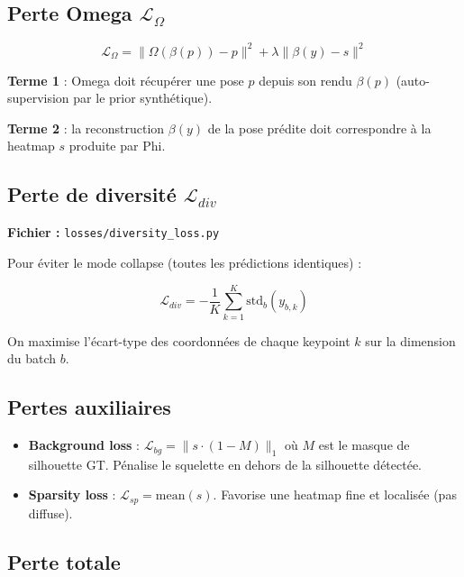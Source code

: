 \documentclass[12pt,a4paper]{article}
\begin{document}
\subsection{Perte Omega $\mathcal{L}_\Omega$}

\begin{equation}
  \mathcal{L}_\Omega = \|\Omega(\beta(p)) - p\|^2 + \lambda \|\beta(y) - s\|^2
\end{equation}

\textbf{Terme 1} : Omega doit récupérer une pose $p$ depuis son rendu $\beta(p)$
(auto-supervision par le prior synthétique).

\textbf{Terme 2} : la reconstruction $\beta(y)$ de la pose prédite doit correspondre
à la heatmap $s$ produite par Phi.

\subsection{Perte de diversité $\mathcal{L}_{div}$}

\textbf{Fichier :} \texttt{losses/diversity\_loss.py}

Pour éviter le mode collapse (toutes les prédictions identiques) :

\begin{equation}
  \mathcal{L}_{div} = -\frac{1}{K} \sum_{k=1}^{K} \text{std}_{b}(y_{b,k})
\end{equation}

On maximise l'écart-type des coordonnées de chaque keypoint $k$ sur la dimension
du batch $b$.

\subsection{Pertes auxiliaires}

\begin{itemize}
  \item \textbf{Background loss} : $\mathcal{L}_{bg} = \|s \cdot (1 - M)\|_1$
        où $M$ est le masque de silhouette GT. Pénalise le squelette en dehors
        de la silhouette détectée.
  \item \textbf{Sparsity loss} : $\mathcal{L}_{sp} = \text{mean}(s)$.
        Favorise une heatmap fine et localisée (pas diffuse).
\end{itemize}

\subsection{Perte totale}
\end{document}
